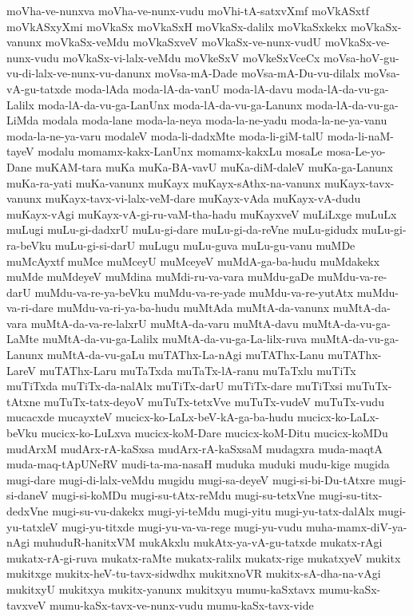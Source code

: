 {moVha-ve-nunxva
moVha-ve-nunx-vudu
moVhi-tA-satxvXmf
moVkASxtf
moVkASxyXmi
moVkaSx
moVkaSxH
moVkaSx-dalilx
moVkaSxkekx
moVkaSx-vanunx
moVkaSx-veMdu
moVkaSxveV
moVkaSx-ve-nunx-vudU
moVkaSx-ve-nunx-vudu
moVkaSx-vi-lalx-veMdu
moVkeSxV
moVkeSxVceCx
moVsa-hoV-gu-vu-di-lalx-ve-nunx-vu-danunx
moVsa-mA-Dade
moVsa-mA-Du-vu-dilalx
moVsa-vA-gu-tatxde
moda-lAda
moda-lA-da-vanU
moda-lA-davu
moda-lA-da-vu-ga-Lalilx
moda-lA-da-vu-ga-LanUnx
moda-lA-da-vu-ga-Lanunx
moda-lA-da-vu-ga-LiMda
modala
moda-lane
moda-la-neya
moda-la-ne-yadu
moda-la-ne-ya-vanu
moda-la-ne-ya-varu
modaleV
moda-li-dadxMte
moda-li-giM-talU
moda-li-naM-tayeV
modalu
momamx-kakx-LanUnx
momamx-kakxLu
mosaLe
mosa-Le-yo-Dane
muKAM-tara
muKa
muKa-BA-vavU
muKa-diM-daleV
muKa-ga-Lanunx
muKa-ra-yati
muKa-vanunx
muKayx
muKayx-sAthx-na-vanunx
muKayx-tavx-vanunx
muKayx-tavx-vi-lalx-veM-dare
muKayx-vAda
muKayx-vA-dudu
muKayx-vAgi
muKayx-vA-gi-ru-vaM-tha-hadu
muKayxveV
muLiLxge
muLuLx
muLugi
muLu-gi-dadxrU
muLu-gi-dare
muLu-gi-da-reVne
muLu-gidudx
muLu-gi-ra-beVku
muLu-gi-si-darU
muLugu
muLu-guva
muLu-gu-vanu
muMDe
muMcAyxtf
muMce
muMceyU
muMceyeV
muMdA-ga-ba-hudu
muMdakekx
muMde
muMdeyeV
muMdina
muMdi-ru-va-vara
muMdu-gaDe
muMdu-va-re-darU
muMdu-va-re-ya-beVku
muMdu-va-re-yade
muMdu-va-re-yutAtx
muMdu-va-ri-dare
muMdu-va-ri-ya-ba-hudu
muMtAda
muMtA-da-vanunx
muMtA-da-vara
muMtA-da-va-re-lalxrU
muMtA-da-varu
muMtA-davu
muMtA-da-vu-ga-LaMte
muMtA-da-vu-ga-Lalilx
muMtA-da-vu-ga-La-lilx-ruva
muMtA-da-vu-ga-Lanunx
muMtA-da-vu-gaLu
muTAThx-La-nAgi
muTAThx-Lanu
muTAThx-LareV
muTAThx-Laru
muTaTxda
muTaTx-lA-ranu
muTaTxlu
muTiTx
muTiTxda
muTiTx-da-nalAlx
muTiTx-darU
muTiTx-dare
muTiTxsi
muTuTx-tAtxne
muTuTx-tatx-deyoV
muTuTx-tetxVve
muTuTx-vudeV
muTuTx-vudu
mucacxde
mucayxteV
mucicx-ko-LaLx-beV-kA-ga-ba-hudu
mucicx-ko-LaLx-beVku
mucicx-ko-LuLxva
mucicx-koM-Dare
mucicx-koM-Ditu
mucicx-koMDu
mudArxM
mudArx-rA-kaSxsa
mudArx-rA-kaSxsaM
mudagxra
muda-maqtA
muda-maq-tApUNeRV
mudi-ta-ma-nasaH
muduka
muduki
mudu-kige
mugida
mugi-dare
mugi-di-lalx-veMdu
mugidu
mugi-sa-deyeV
mugi-si-bi-Du-tAtxre
mugi-si-daneV
mugi-si-koMDu
mugi-su-tAtx-reMdu
mugi-su-tetxVne
mugi-su-titx-dedxVne
mugi-su-vu-dakekx
mugi-yi-teMdu
mugi-yitu
mugi-yu-tatx-dalAlx
mugi-yu-tatxleV
mugi-yu-titxde
mugi-yu-va-va-rege
mugi-yu-vudu
muha-mamx-diV-ya-nAgi
muhuduR-hanitxVM
mukAkxlu
mukAtx-ya-vA-gu-tatxde
mukatx-rAgi
mukatx-rA-gi-ruva
mukatx-raMte
mukatx-ralilx
mukatx-rige
mukatxyeV
mukitx
mukitxge
mukitx-heV-tu-tavx-sidwdhx
mukitxnoVR
mukitx-sA-dha-na-vAgi
mukitxyU
mukitxya
mukitx-yanunx
mukitxyu
mumu-kaSxtavx
mumu-kaSx-tavxveV
mumu-kaSx-tavx-ve-nunx-vudu
mumu-kaSx-tavx-vide
}
